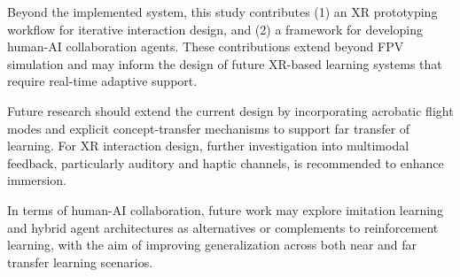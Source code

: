 Beyond the implemented system, this study contributes (1) an XR prototyping workflow for iterative interaction design, and (2) a framework for developing human-AI collaboration agents. These contributions extend beyond FPV simulation and may inform the design of future XR-based learning systems that require real-time adaptive support.

Future research should extend the current design by incorporating acrobatic flight modes and explicit concept-transfer mechanisms to support far transfer of learning. For XR interaction design, further investigation into multimodal feedback, particularly auditory and haptic channels, is recommended to enhance immersion.

In terms of human-AI collaboration, future work may explore imitation learning and hybrid agent architectures as alternatives or complements to reinforcement learning, with the aim of improving generalization across both near and far transfer learning scenarios.